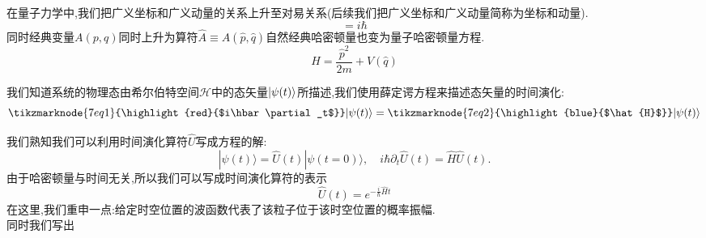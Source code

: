 在量子力学中,我们把广义坐标和广义动量的关系上升至对易关系(后续我们把广义坐标和广义动量简称为坐标和动量).
\begin{equation}
	[\hat{q},\hat{p}]=i\hbar
\end{equation}
同时经典变量$A(p,q)$同时上升为算符$\hat{A}\equiv A(\hat{p},\hat{q})$自然经典哈密顿量也变为量子哈密顿量方程.
\begin{equation}
	\hat{H}=\frac{\hat{p}^2}{2m}+V(\hat{q})
\end{equation}


我们知道系统的物理态由希尔伯特空间$ \mathcal H $中的态矢量$|\psi(t)\rangle$所描述,我们使用薛定谔方程来描述态矢量的时间演化:\\

\begin{equation}
	\vspace{\baselineskip}
	\tikzmarknode{7eq1}{\highlight{red}{$i\hbar\partial_t$}}|\psi(t)\rangle=\tikzmarknode{7eq2}{\highlight{blue}{$\hat{H}$}}|\psi(t)\rangle
\end{equation}

我们熟知我们可以利用时间演化算符$\hat U$写成方程的解:
\begin{equation}
	|\psi(t)\rangle=\hat{U}(t)|\psi(t=0)\rangle,\quad i\hbar\partial_t\hat{U}(t)=\hat{H}\hat{U}(t).
\end{equation}
由于哈密顿量与时间无关,所以我们可以写成时间演化算符的表示
\begin{equation}
	\hat{U}(t)=e^{-\frac i\hbar\hat{H}t}
\end{equation}
在这里,我们重申一点:给定时空位置的波函数代表了该粒子位于该时空位置的概率振幅.\\
同时我们写出\\\\\\

